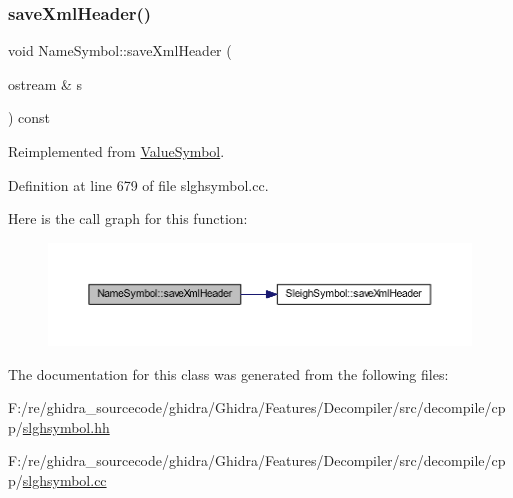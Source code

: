 \subsubsection{\texorpdfstring{saveXmlHeader()}{saveXmlHeader()}}
{\footnotesize\ttfamily void Name\+Symbol\+::save\+Xml\+Header (\begin{DoxyParamCaption}\item[{ostream \&}]{s }\end{DoxyParamCaption}) const\hspace{0.3cm}{\ttfamily [virtual]}}



Reimplemented from \mbox{\hyperlink{class_value_symbol_a7b1c84bd9d7e84f9272d448d10c31200}{Value\+Symbol}}.



Definition at line 679 of file slghsymbol.\+cc.

Here is the call graph for this function\+:
\nopagebreak
\begin{figure}[H]
\begin{center}
\leavevmode
\includegraphics[width=350pt]{class_name_symbol_a6579b3f6516743c8ba34aa2e86429a14_cgraph}
\end{center}
\end{figure}


The documentation for this class was generated from the following files\+:\begin{DoxyCompactItemize}
\item 
F\+:/re/ghidra\+\_\+sourcecode/ghidra/\+Ghidra/\+Features/\+Decompiler/src/decompile/cpp/\mbox{\hyperlink{slghsymbol_8hh}{slghsymbol.\+hh}}\item 
F\+:/re/ghidra\+\_\+sourcecode/ghidra/\+Ghidra/\+Features/\+Decompiler/src/decompile/cpp/\mbox{\hyperlink{slghsymbol_8cc}{slghsymbol.\+cc}}\end{DoxyCompactItemize}
